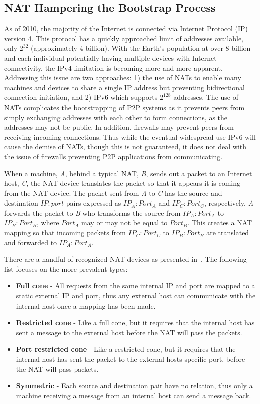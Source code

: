 \documentclass[conference]{IEEEtran}
\begin{document}
\subsection{NAT Hampering the Bootstrap Process}

As of 2010, the majority of the Internet is connected via Internet Protocol
(IP) version 4.  This protocol has a quickly approached limit of addresses
available,  only $2^{32}$ (approximately 4 billion).  With the Earth's
population at over 8 billion and each individual potentially having multiple
devices with Internet connectivity, the IPv4 limitation is becoming more and
more apparent.  Addressing this issue are two approaches:  1) the use of NATs
to enable many machines and devices to share a single IP address but preventing
bidirectional connection initiation, and 2) IPv6 which supports $2^{128}$
addresses.  The use of NATs complicates the bootstrapping of P2P systems as it
prevents peers from simply exchanging addresses with each other to form
connections, as the addresses may not be public.  In addition, firewalls may
prevent peers from receiving incoming connections.  Thus while the eventual
widespread use IPv6 will cause the demise of NATs, though this is not
guaranteed, it does not deal with the issue of firewalls preventing P2P
applications from communicating.

When a machine, \textit{A}, behind a typical NAT, \textit{B}, sends out a
packet to an Internet host, \textit{C}, the NAT device translates the packet so
that it appears it is coming from the NAT device.  The packet sent from
\textit{A} to \textit{C} has the source and destination $IP:port$ pairs
expressed as $IP_A:Port_A$ and $IP_C:Port_C$, respectively.  \textit{A}
forwards the packet to \textit{B} who transforms the source from $IP_A:Port_A$
to $IP_B:Port_B$, where $Port_A$ may or may not be equal to $Port_B$.  This
creates a NAT mapping so that incoming packets from $IP_C:Port_C$ to
$IP_B:Port_B$ are translated and forwarded to $IP_A:Port_A$.

There are a handful of recognized NAT devices as presented in~\cite{stun,
p2p_nats_rfc}.  The following list focuses on the more prevalent types:
\begin{itemize}
\item \textbf{Full cone} - All requests from the same internal IP and port are
mapped to a static external IP and port, thus any external host can communicate
with the internal host once a mapping has been made.
\item \textbf{Restricted cone} - Like a full cone, but it requires that the
internal host has sent a message to the external host before the NAT will pass
the packets.
\item \textbf{Port restricted cone} - Like a restricted cone, but it requires
that the internal host has sent the packet to the external hosts specific port,
before the NAT will pass packets.
\item \textbf{Symmetric} - Each source and destination pair have no relation,
thus only a machine receiving a message from an internal host can send a
message back.
\end{itemize}
\end{document}
